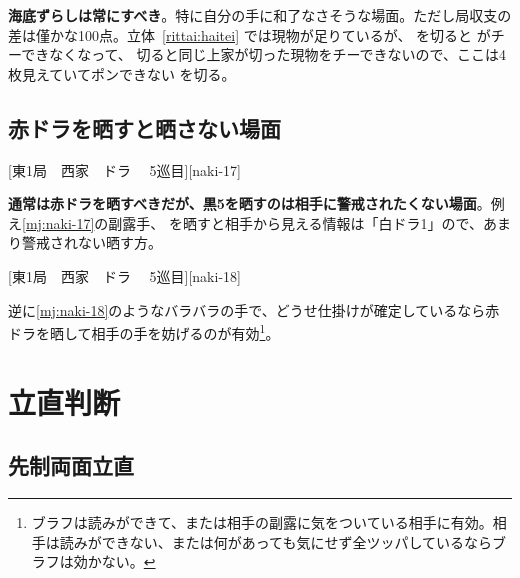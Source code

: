 \documentclass[10pt, twocolumn]{article}
\begin{document}
\textbf{海底ずらしは常にすべき}\citep[][p.~190]{hirasawa-naki}。特に自分の手に和了なさそうな場面。ただし局収支の差は僅かな100点\citep[][p. 188]{miinin-choice}。立体~\ref{rittai:haitei} では現物が足りているが、 を切ると  がチーできなくなって、 切ると同じ上家が切った現物をチーできないので、ここは4枚見えていてポンできない  を切る。

\subsection{赤ドラを晒すと晒さない場面}

[東1局　西家　ドラ 　5巡目][naki-17]

\textbf{通常は赤ドラを晒すべきだが、黒5を晒すのは相手に警戒されたくない場面}\citep[][p.~194]{hirasawa-naki}。例え\ref{mj:naki-17}の副露手、 を晒すと相手から見える情報は「白ドラ1」ので、あまり警戒されない晒す方。

[東1局　西家　ドラ 　5巡目][naki-18]

逆に\ref{mj:naki-18}のようなバラバラの手で、どうせ仕掛けが確定しているなら赤ドラを晒して相手の手を妨げるのが有効\footnote{ブラフは読みができて、または相手の副露に気をついている相手に有効。相手は読みができない、または何があっても気にせず全ツッパしているならブラフは効かない。}\citep[][pp.~196--197]{hirasawa-naki}。


\section{立直判断}

\subsection{先制両面立直}
\end{document}
